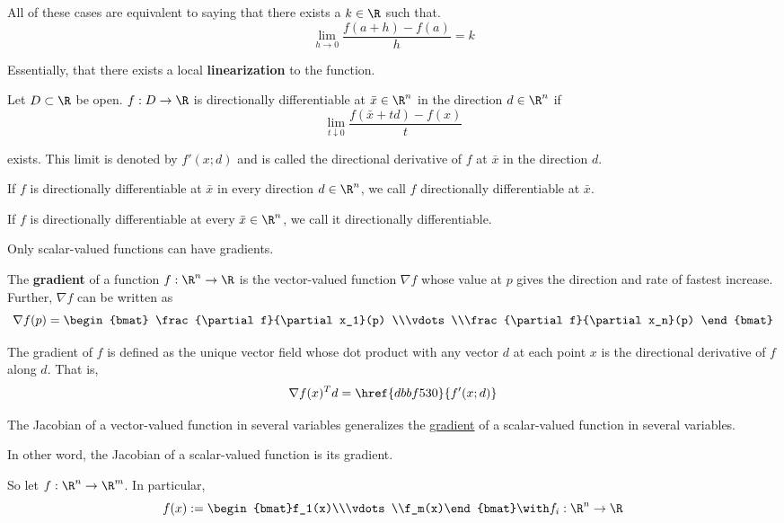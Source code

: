 All of these cases are equivalent to saying that there exists a $k\in\R$ such
that.
$$
  \lim_{h\to0}\frac{f(a+h)-f(a)}h=k
$$

Essentially, that there exists a local \textbf{linearization} to the function.

\label{dbbf530}

Let $D\subset \R$ be open. $f:D\to\R$ is directionally differentiable at $\bar
x\in\R^n$ in the direction $d\in\R^n$ if
$$
  \lim_{t\downarrow0}\frac{f(\bar x+td)-f(x)}t
$$

exists. This limit is denoted by $f'(x;d)$ and is called the directional
derivative of $f$ at $\bar x$ in the direction $d$.

If $f$ is directionally differentiable at $\bar x$ in every direction
$d\in\R^n$, we call $f$ directionally differentiable at $\bar x$.

If $f$ is directionally differentiable at every $\bar x\in\R^n$, we call it
directionally differentiable.

\label{dad2713}

Only scalar-valued functions can have gradients.

The \textbf{gradient} of a function $f:\R^n\to\R$ is the vector-valued function
$\nabla f$ whose value at $p$ gives the direction and rate of fastest increase.
Further, $\nabla f$ can be written as
$$
  \nabla f(p)=\begin{bmat}
    \frac{\partial f}{\partial x_1}(p) \\\vdots\\\frac{\partial f}{\partial x_n}(p)
  \end{bmat}
$$

The gradient of $f$ is defined as the unique vector field whose dot product
with any vector $d$ at each point $x$ is the directional derivative of $f$
along $d$. That is,
$$
  \nabla f(x)^Td=\href{dbbf530}{f'(x;d)}
$$

\label{a2ceb99}

The Jacobian of a vector-valued function in several variables generalizes the
\href{dad2713}{gradient} of a scalar-valued function in several variables.

In other word, the Jacobian of a scalar-valued function is its gradient.

So let $f:\R^n\to\R^m$. In particular,
$$
  f(x):=\begin{bmat}f_1(x)\\\vdots\\f_m(x)\end{bmat}\with f_i:\R^n\to\R
$$

